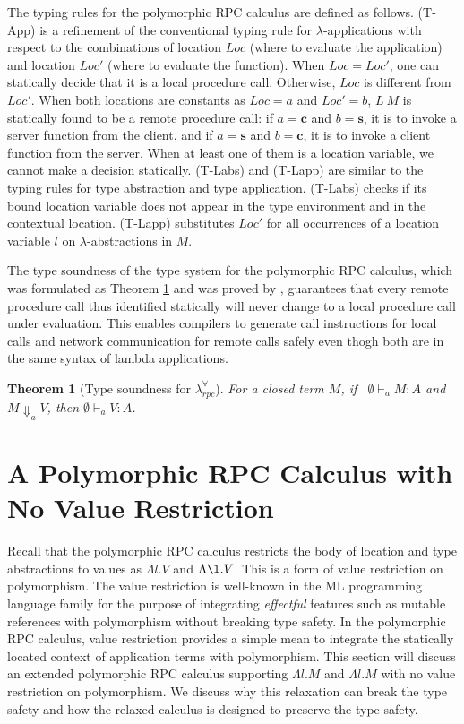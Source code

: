 \documentclass[a4paper]{article}
\theoremstyle{plain}
\newtheorem{theorem}{Theorem}
\theoremstyle{definition}
\newcommand{\polyrpc}{$\lambda_{rpc}^{\forall}$\xspace}
\newcommand{\client}{\textbf{c}}
\newcommand{\server}{\textbf{s}}
\newcommand{\evalRPC}[3]{#1\Downarrow_{#2}#3}
\newcommand{\typing}[4]{#1\vdash_{#2} #3 : #4}
\newcommand{\Loc}{Loc}
\begin{document}
The typing rules for the polymorphic RPC calculus are defined as
follows.
%
(T-App) is a refinement of the conventional typing rule for
$\lambda$-applications with respect to the combinations of location
$\Loc$ (where to evaluate the application) and location $\Loc'$ (where
to evaluate the function).
%
When $\Loc=\Loc'$, one can statically decide that it is a local
procedure call.
%
Otherwise, $\Loc$ is different from $\Loc'$.
%
When both locations are constants as $\Loc=a$ and $\Loc'=b$, $L \ M$
is statically found to be a remote procedure call: if $a=\client$ and
$b=\server$, it is to invoke a server function from the client, and if
$a=\server$ and $b=\client$, it is to invoke a client function from
the server.
%
When at least one of them is a location variable, we cannot make a
decision statically.
%
(T-Labs) and (T-Lapp) are similar to the typing rules for type
abstraction and type application.
%
(T-Labs) checks if its bound location variable does not appear in the
type environment and in the contextual location.
%
(T-Lapp) substitutes $\Loc'$ for all occurrences of a location
variable $l$ on $\lambda$-abstractions in $M$.

The type soundness of the type system for the polymorphic RPC
calculus, which was formulated as Theorem \ref{thm:typesoundness} and
was proved by \cite{CHOI:scp2020}, guarantees that every remote
procedure call thus identified statically will never change to a local
procedure call under evaluation.
%
This enables compilers to generate call instructions for local calls
and network communication for remote calls safely even thogh both are
in the same syntax of lambda applications.

\begin{theorem}[Type soundness for \polyrpc \cite{CHOI:scp2020}]
For a closed term $M$, if \ $\typing{\emptyset}{a}{M}{A}$ and
$\evalRPC{M}{a}{V}$, then $\typing{\emptyset}{a}{V}{A}$.
\label{thm:typesoundness}
\end{theorem}

\section{A Polymorphic RPC Calculus with No Value Restriction}
\label{app:2}

Recall that the polymorphic RPC calculus restricts the body of
location and type abstractions to values as $\Lambda l. V$ and
$\Lambda\l.V$.
%
This is a form of value restriction on polymorphism.
%
The value restriction is well-known in the ML programming language
family for the purpose of integrating {\it effectful} features such as
mutable references with polymorphism without breaking type safety.
%
In the polymorphic RPC calculus, value restriction provides a simple
mean to integrate the statically located context of application terms
with polymorphism.
%
This section will discuss an extended polymorphic RPC calculus
supporting $\Lambda l.M$ and $\Lambda l.M$ with no value restriction
on polymorphism.
%
We discuss why this relaxation can break the type safety and how the
relaxed calculus is designed to preserve the type safety.
\end{document}
